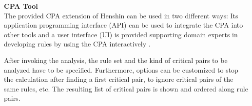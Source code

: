 \textbf{CPA Tool}\\
The provided CPA extension of Henshin can be used in two different ways: Its application programming interface (API) can be used to integrate the CPA into other tools and a user interface (UI) is provided supporting domain experts in developing rules by using the CPA interactively \cite{mens2007analysing}.

After invoking the analysis, the rule set and the kind of critical pairs to be analyzed have to be specified. Furthermore, options can be customized to stop the calculation after finding a first critical pair, to ignore critical pairs of the same rules, etc. The resulting list of critical pairs is shown and ordered along rule pairs. 

